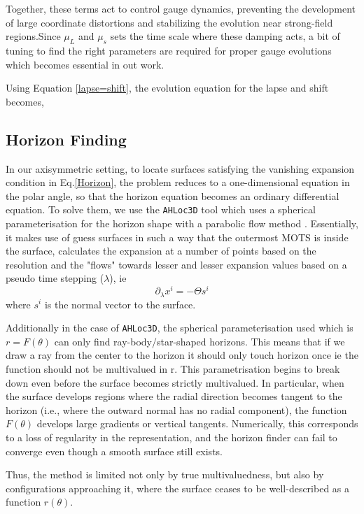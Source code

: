 \documentclass[11pt]{article}
\begin{document}
Together, these terms act to control gauge dynamics, preventing the development of large coordinate distortions and stabilizing the evolution near strong-field regions.Since $\mu_L$ and $\mu_s$ sets the time scale where these damping acts, a bit of tuning to find the right parameters are required for proper gauge evolutions which becomes essential in out work.

Using Equation \ref{lapse=shift}, the evolution equation for the lapse and shift becomes, 


\subsection{Horizon Finding}

In our axisymmetric setting, to locate surfaces satisfying the vanishing expansion condition in Eq.\ref{Horizon}, the problem reduces to a one-dimensional equation in the polar angle, so that the horizon equation becomes an ordinary differential equation. To solve them, we use the \texttt{AHLoc3D} tool which uses a spherical parameterisation for the horizon shape with a parabolic flow method \cite{thornburg_2007}. Essentially, it makes use of guess surfaces in such a way that the outermost MOTS is inside the surface, calculates the expansion at a number of points based on the resolution and the "flows" towards lesser and lesser expansion values based on a pseudo time stepping ($\lambda$), ie
$$
\partial_\lambda x^i = - \Theta s^i
$$
where $s^i$ is the normal vector to the surface.

Additionally in the case of \texttt{AHLoc3D}, the spherical parameterisation used which is $r = F(\theta)$ can only find ray-body/star-shaped horizons. This means that if we draw a ray from the center to the horizon it should only touch horizon once ie the function should not be multivalued in r. This parametrisation begins to break down even before the surface becomes strictly multivalued. In particular, when the surface develops regions where the radial direction becomes tangent to the horizon (i.e., where the outward normal has no radial component), the function $F(\theta)$ develops large gradients or vertical tangents. Numerically, this corresponds to a loss of regularity in the representation, and the horizon finder can fail to converge even though a smooth surface still exists.

Thus, the method is limited not only by true multivaluedness, but also by configurations approaching it, where the surface ceases to be well-described as a function $r(\theta)$.
\end{document}
